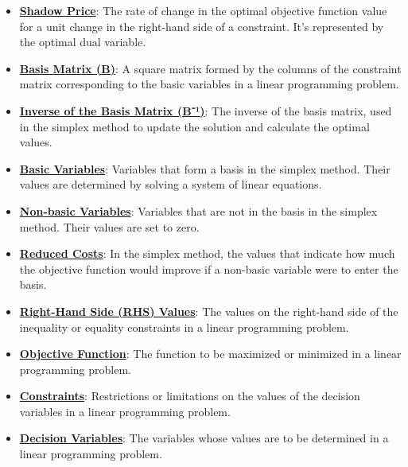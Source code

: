 \documentclass{article}%
\begin{document}
\begin{itemize}[leftmargin=*]
\item \href{https://www.math.purdue.edu/~yipn/421/2024-10-01-SensitivityDuality.pdf#page=10}{\textbf{Shadow Price}}: The rate of change in the optimal objective function value for a unit change in the right-hand side of a constraint. It's represented by the optimal dual variable. %
\item \href{https://www.math.purdue.edu/~yipn/421/2024-10-01-SensitivityDuality.pdf#page=7}{\textbf{Basis Matrix (B)}}: A square matrix formed by the columns of the constraint matrix corresponding to the basic variables in a linear programming problem. %
\item \href{https://www.math.purdue.edu/~yipn/421/2024-10-01-SensitivityDuality.pdf#page=7}{\textbf{Inverse of the Basis Matrix (B⁻¹)}}: The inverse of the basis matrix, used in the simplex method to update the solution and calculate the optimal values. %
\item \href{https://www.math.purdue.edu/~yipn/421/2024-10-01-SensitivityDuality.pdf#page=2}{\textbf{Basic Variables}}: Variables that form a basis in the simplex method. Their values are determined by solving a system of linear equations. %
\item \href{https://www.math.purdue.edu/~yipn/421/2024-10-01-SensitivityDuality.pdf#page=2}{\textbf{Non{-}basic Variables}}: Variables that are not in the basis in the simplex method. Their values are set to zero. %
\item \href{https://www.math.purdue.edu/~yipn/421/2024-10-01-SensitivityDuality.pdf#page=7}{\textbf{Reduced Costs}}: In the simplex method, the values that indicate how much the objective function would improve if a non-basic variable were to enter the basis. %
\item \href{https://www.math.purdue.edu/~yipn/421/2024-10-01-SensitivityDuality.pdf#page=8}{\textbf{Right{-}Hand Side (RHS) Values}}: The values on the right-hand side of the inequality or equality constraints in a linear programming problem. %
\item \href{https://www.math.purdue.edu/~yipn/421/2024-10-01-SensitivityDuality.pdf#page=1}{\textbf{Objective Function}}: The function to be maximized or minimized in a linear programming problem. %
\item \href{https://www.math.purdue.edu/~yipn/421/2024-10-01-SensitivityDuality.pdf#page=1}{\textbf{Constraints}}: Restrictions or limitations on the values of the decision variables in a linear programming problem. %
\item \href{https://www.math.purdue.edu/~yipn/421/2024-10-01-SensitivityDuality.pdf#page=1}{\textbf{Decision Variables}}: The variables whose values are to be determined in a linear programming problem. %

\end{itemize}
\end{document}
